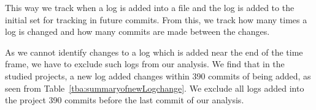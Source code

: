 This way we track when a log is added into a file and the log is added to the initial set for tracking in future commits. From this, we track how many times a log is changed and how many commits are made between the changes. 

As we cannot identify changes to a log which is added near the end of the time frame, we have to exclude such logs from our analysis. We find that in the studied projects, a new log added changes within 390 commits of being added, as seen from Table~\ref{tba:summaryofnewLogchange}. We exclude all logs added into the project 390 commits before the last commit of our analysis. 














